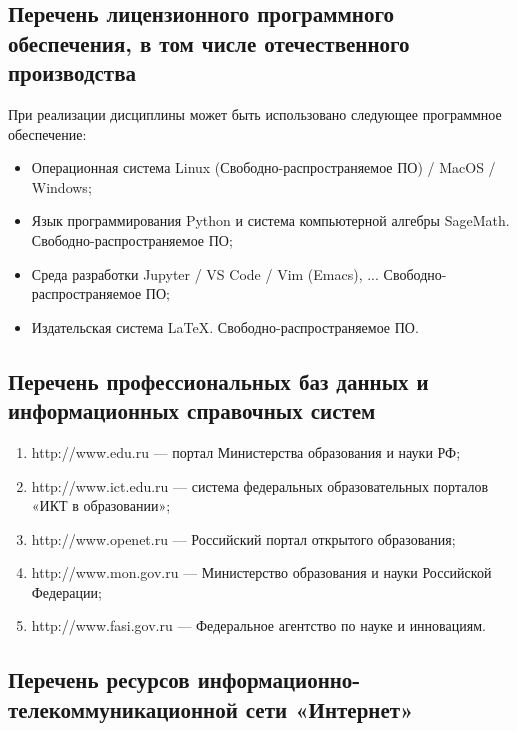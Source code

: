 \documentclass[a4paper, 12pt]{article}
\begin{document}
\subsection{Перечень лицензионного программного обеспечения, в том числе отечественного производства}

При реализации дисциплины может быть использовано следующее программное обеспечение:
\begin{itemize}
    \item Операционная система Linux (Свободно-распространяемое ПО) / MacOS / Windows;
    \item Язык программирования Python и система компьютерной алгебры SageMath. Свободно-распространяемое ПО;
    \item Среда разработки Jupyter / VS Code / Vim (Emacs), ... Свободно-распространяемое ПО;
    \item Издательская система LaTeX. Свободно-распространяемое ПО.
\end{itemize}

\subsection{Перечень профессиональных баз данных и информационных справочных систем}

\begin{enumerate}
    \item http://www.edu.ru --- портал Министерства образования и науки РФ;
    \item http://www.ict.edu.ru --- система федеральных образовательных порталов «ИКТ в образовании»;
    \item http://www.openet.ru --- Российский портал открытого образования;
    \item http://www.mon.gov.ru  --- Министерство образования и науки Российской Федерации;
    \item http://www.fasi.gov.ru --- Федеральное агентство по науке и инновациям.
\end{enumerate}

\subsection{Перечень ресурсов информационно-телекоммуникационной сети «Интернет»}
\end{document}
